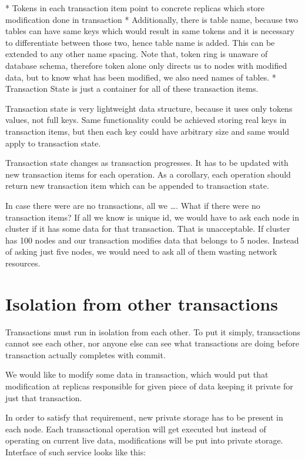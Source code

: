 * Tokens in each transaction item point to concrete replicas which store modification done in transaction
* Additionally, there is table name, because two tables can have same keys which would result in same tokens and it is necessary to differentiate between those two, hence table name is added. This can be extended to any other name spacing. Note that, token ring is unaware of database schema, therefore token alone only directs us to nodes with modified data, but to know what has been modified, we also need names of tables.
* Transaction State is just a container for all of these transaction items.


Transaction state is very lightweight data structure, because it uses only tokens values, not full keys. Same functionality could be achieved storing real keys in transaction items, but then each key could have arbitrary size and same would apply to transaction state.


Transaction state changes as transaction progresses. It has to be updated with new transaction items for each operation. As a corollary, each operation should return new transaction item which can be appended to transaction state. 


In case there were are no transactions, all we ….
What if there were no transaction items? If all we know is unique id, we would have to ask each node in cluster if it has some data for that transaction. That is unacceptable. If cluster has 100 nodes and our transaction modifies data that belongs to 5 nodes. Instead of asking just five nodes, we would need to ask all of them wasting network resources.


\section{Isolation from other transactions}
Transactions must run in isolation from each other. To put it simply, transactions cannot see each other, nor anyone else can see what transactions are doing before transaction actually completes with commit.


We would like to modify some data in transaction, which would put that modification at replicas responsible for given piece of data keeping it private for just that transaction.


In order to satisfy that requirement, new private storage has to be present in each node.
Each transactional operation will get executed but instead of operating on current live data, modifications will be put into private storage. Interface of such service looks like this:


